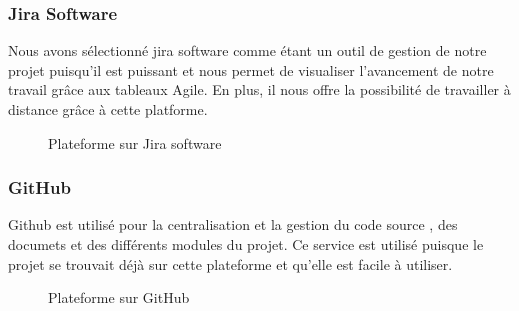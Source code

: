 	\subsubsection{Jira Software}
	Nous avons sélectionné jira software comme étant un outil de gestion de notre projet puisqu'il est  puissant et nous permet de visualiser l'avancement de notre travail grâce aux tableaux Agile. En plus, il nous offre la possibilité de travailler à distance grâce à cette platforme.
	\begin{figure}[h]
		\begin{center}
			\centering
		\end{center}
		\caption{Plateforme sur Jira software}
	\end{figure}
	\subsubsection{GitHub}
	Github est utilisé pour la centralisation et la gestion du code source , des documets et des différents modules du projet. Ce service est utilisé puisque le projet se trouvait déjà sur cette plateforme et qu’elle est facile à utiliser.
	\begin{figure}[h]
		\begin{center}
			\centering
		\end{center}
		\caption{Plateforme sur GitHub}
	\end{figure}
